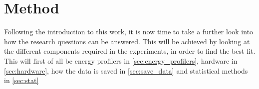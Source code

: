 \chapter{Method}\label{ch:method}

Following the introduction to this work, it is now time to take a further look into how the research questions can be answered. This will be achieved by looking at the different components required in the experiments, in order to find the best fit. This will first of all be energy profilers in \cref*{sec:energy_profilers}, hardware in \cref*{sec:hardware}, how the data is saved in \cref*{sec:save_data}  and statistical methods in \cref*{sec:stat}








